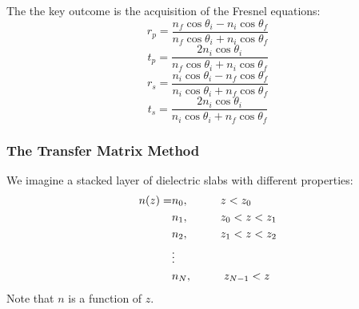 \documentclass{beamer}
\begin{document}
	
\begin{frame}
	
	

The the key outcome is the acquisition of the Fresnel equations: 
\begin{equation}\label{fresnel1}
	r_{p} = \frac{ n_{f} \cos \theta_{i} - n_{i} \cos \theta_{f} }{ n_{f} \cos \theta_{i} + n_{i} \cos \theta_{f}}
\end{equation}
\begin{equation}
	t_{p} = \frac{ 2 n_{i} \cos \theta_{i} }{ n_{f} \cos \theta_{i} + n_{i} \cos \theta_{f}}
\end{equation}
\begin{equation}
	r_{s} = \frac{ n_{i} \cos \theta_{i} - n_{f} \cos \theta_{f} }{ n_{i} \cos \theta_{i} + n_{f} \cos \theta_{f}}
\end{equation}
\begin{equation}\label{fresnel2}
	t_{s} = \frac{ 2 n_{i} \cos \theta_{i} }{ n_{i} \cos \theta_{i} + n_{f} \cos \theta_{f}}
\end{equation}



\end{frame}	






\begin{frame}
	
	
	
\frametitle{The Transfer Matrix Method}



We imagine a stacked layer of dielectric slabs with different properties:
\begin{align}\label{layers}
	n(z) =& n_{0}, \hspace{10mm} z < z_{0}                  \nonumber \\
	& n_{1}, \hspace{10mm} z_{0} < z < z_{1}           \nonumber \\
	& n_{2}, \hspace{10mm} z_{1} < z < z_{2}            \nonumber \\
	& \vdots                                             \nonumber \\ 	
	& n_{N}, \hspace{10mm} z_{N - 1} < z                  \nonumber \\	 
\end{align}
Note that $n$ is a function of $z$.



\end{frame}
\end{document}
